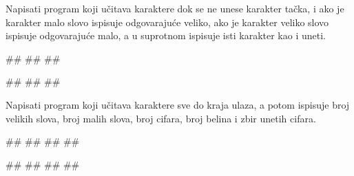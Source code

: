\begin{Exercise}[label=v1.3_07] 
Napisati program koji učitava karaktere dok se ne unese karakter tačka,
i ako je karakter malo slovo ispisuje odgovarajuće veliko, ako je
karakter veliko slovo ispisuje odgovarajuće malo, a u suprotnom
ispisuje isti karakter kao i uneti.

\begin{miditest}
\begin{upotreba}{1}
#\naslovInt#
##
##
\end{upotreba}
\end{miditest}
\begin{miditest}
\begin{upotreba}{2}
#\naslovInt#
##
##
\end{upotreba}
\end{miditest}
\end{Exercise}
\begin{Answer}[ref=v1.3_07]
\end{Answer}

\begin{Exercise}[label=v1.3_08] 
Napisati program koji učitava karaktere sve do kraja ulaza, a potom
ispisuje broj velikih slova, broj malih slova, broj cifara, broj
belina i zbir unetih cifara.

\begin{miditest}
\begin{upotreba}{1}
#\naslovInt#
##
##
##
\end{upotreba}
\end{miditest}
\begin{miditest}
\begin{upotreba}{2}
#\naslovInt#
##
##
##
\end{upotreba}
\end{miditest}
\end{Exercise}
\begin{Answer}[ref=v1.3_08]
\end{Answer}


